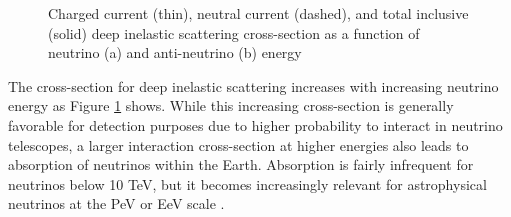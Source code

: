 \documentclass{gatech-thesis}
\begin{document}
\begin{figure}
\centering
{}
\caption[(Anti-)Neutrino Deep Inelastic Scattering Cross-Section]{Charged current (thin), neutral current (dashed), and total inclusive (solid) deep inelastic scattering cross-section as a function of neutrino (a) and anti-neutrino (b) energy \cite{Gandhi:1998ri}}
\label{fig:NeutrinoDIS_CrossSection}
\end{figure}

The cross-section for deep inelastic scattering increases with increasing neutrino energy as Figure \ref{fig:NeutrinoDIS_CrossSection} shows. While this increasing cross-section is generally favorable for detection purposes due to higher probability to interact in neutrino telescopes, a larger interaction cross-section at higher energies also leads to absorption of neutrinos within the Earth. Absorption is fairly infrequent for neutrinos below 10 TeV, but it becomes increasingly relevant for astrophysical neutrinos at the PeV or EeV scale \cite{2013arXiv1304.4891K}.
\end{document}
